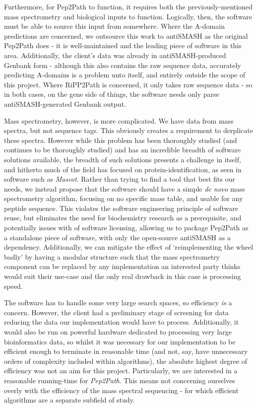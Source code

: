 \documentclass{l4proj}
\newcommand{\cit}[1]{\citep{#1}}
\begin{document}
Furthermore, for Pep2Path to function, it requires both the previously-mentioned mass spectrometry and biological inputs to function. Logically, then, the software must be able to source this input from somewhere. Where the A-domain predictions are concerned, we outsource this work to antiSMASH as the original Pep2Path does - it is well-maintained and the leading piece of software in this area. Additionally, the client's data was already in antiSMASH-produced Genbank form - although this also contains the raw sequence data, accurately predicting A-domains is a problem unto itself, and entirely outside the scope of this project. Where RiPP2Path is concerned, it only takes raw sequence data - so in both cases, on the gene side of things, the software needs only parse antiSMASH-generated Genbank output.

Mass spectrometry, however, is more complicated. We have data from mass spectra, but not sequence tags. This obviously creates a requirement to derplicate these spectra. However while this problem has been thoroughly studied (and continues to be thoroughly studied) and has an incredible breadth of software solutions available, the breadth of such solutions presents a challenge in itself, and hitherto much of the field has focused on protein-identification, \cit{msomics} as seen in software such as \textit{Mascot}. \cit{mascot} Rather than trying to find a tool that best fits our needs, we instead propose that the software should have a simple \textit{de novo} mass spectrometry algorithm, focusing on no specific mass table, and usable for any peptide sequence. This violates the software engineering principle of software reuse, but eliminates the need for biochemistry research as a prerequisite, and potentially issues with of software licensing, allowing us to package Pep2Path as a standalone piece of software, with only the open-source antiSMASH as a dependency. Additionally, we can mitigate the effect of `reimplementing the wheel badly' by having a modular structure such that the mass spectrometry component can be replaced by any implementation an interested party thinks would suit their use-case and the only real drawback in this case is processing speed.

The software has to handle some very large search spaces, so efficiency \textit{is} a concern. However, the client had a preliminary stage of screening for data reducing the data our implementation would have to process. Additionally, it would also be run on powerful hardware dedicated to processing very large bioinformatics data, so whilst it was necessary for our implementation to be efficient enough to terminate in reasonable time (and not, say, have unnecessary orders of complexity included within algorithms), the absolute highest degree of efficiency was not an aim for this project. Particularly, we are interested in a reasonable running-time for \textit{Pep2Path}. This means not concerning ourselves overly with the efficiency of the mass spectral sequencing - for which efficient algorithms are a separate subfield of study.
\end{document}
